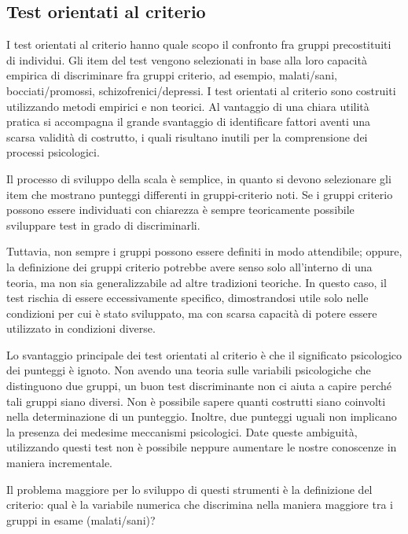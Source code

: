 \documentclass[
  11pt,
]{krantz}
\theoremstyle{definition}
\theoremstyle{definition}
\theoremstyle{definition}
\theoremstyle{definition}
\theoremstyle{remark}
\begin{document}
\hypertarget{test-orientati-al-criterio}{%
\subsection{Test orientati al criterio}\label{test-orientati-al-criterio}}

I test orientati al criterio hanno quale scopo il confronto fra gruppi precostituiti di individui. Gli item del test vengono selezionati in base alla loro capacità empirica di discriminare fra gruppi criterio, ad esempio, malati/sani, bocciati/promossi, schizofrenici/depressi. I test orientati al criterio sono costruiti utilizzando metodi empirici e non teorici. Al vantaggio di una chiara utilità pratica si accompagna il grande svantaggio di identificare fattori aventi una scarsa validità di costrutto, i quali risultano inutili per la comprensione dei processi psicologici.

Il processo di sviluppo della scala è semplice, in quanto si devono selezionare gli item che mostrano punteggi differenti in gruppi-criterio noti. Se i gruppi criterio possono essere individuati con chiarezza è sempre teoricamente possibile sviluppare test in grado di discriminarli.

Tuttavia, non sempre i gruppi possono essere definiti in modo attendibile; oppure, la definizione dei gruppi criterio potrebbe avere senso solo all'interno di una teoria, ma non sia generalizzabile ad altre tradizioni teoriche. In questo caso, il test rischia di essere eccessivamente specifico, dimostrandosi utile solo nelle condizioni per cui è stato sviluppato, ma con scarsa capacità di potere essere utilizzato in condizioni diverse.

Lo svantaggio principale dei test orientati al criterio è che il significato psicologico dei punteggi è ignoto. Non avendo una teoria sulle variabili psicologiche che distinguono due gruppi, un buon test discriminante non ci aiuta a capire perché tali gruppi siano diversi. Non è possibile sapere quanti costrutti siano coinvolti nella determinazione di un punteggio. Inoltre, due punteggi uguali non implicano la presenza dei medesime meccanismi psicologici. Date queste ambiguità, utilizzando questi test non è possibile neppure aumentare le nostre conoscenze in maniera incrementale.

Il problema maggiore per lo sviluppo di questi strumenti è la definizione del criterio: qual è la variabile numerica che discrimina nella maniera maggiore tra i gruppi in esame (malati/sani)?
\end{document}
